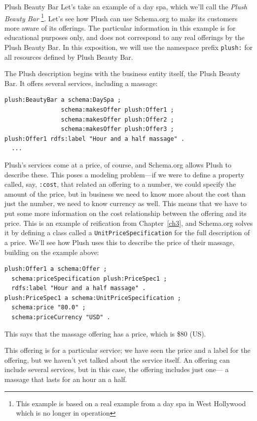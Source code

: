 \begin{example}{Plush Beauty Bar}
\label{Plushex}
Let's take an example of a day spa, which we'll call the 
\emph{Plush Beauty Bar} \footnote{This example is based on a real example from 
a day spa in West Hollywood which is no longer in operation}.   Let's see how
Plush can use Schema.org to make its customers more aware of its
offerings. 
The particular information in this example is
for educational purposes only, and does not correspond to any real
offerings by the Plush Beauty Bar. In this exposition, we will use the
namespace prefix \texttt{plush:} for all resources defined by Plush Beauty Bar.

The Plush description begins with the business entity itself, the
Plush Beauty Bar. It offers several services,
including a massage:

\begin{lstlisting}
plush:BeautyBar a schema:DaySpa ;
                schema:makesOffer plush:Offer1 ;
                schema:makesOffer plush:Offer2 ;
                schema:makesOffer plush:Offer3 ;
plush:Offer1 rdfs:label "Hour and a half massage" .
  ...
\end{lstlisting}


Plush's services come at a price, of course, and Schema.org allows Plush to
describe these.   This poses a modeling problem---if we were to
define a property called, say, \texttt{:cost}, that related an offering to a
number, we could specify the amount of the price, but in business we
need to know more about the cost than just the number, we need to know
currency as well. This means that we have to put some more information
on the cost relationship between the offering and its price. This is an
example of reification from Chapter~\ref{ch3}, and Schema.org
solves it by defining a
class called a \texttt{UnitPriceSpecification} for the full description of a
price. We'll see how Plush uses this to describe the price of their
massage, building on the example above:

\begin{lstlisting}
plush:Offer1 a schema:Offer ;
  schema:priceSpecification plush:PriceSpec1 ;
  rdfs:label "Hour and a half massage" .
plush:PriceSpec1 a schema:UnitPriceSpecification ;
  schema:price "80.0" ;
  schema:priceCurrency "USD" .
\end{lstlisting}

This says that the massage offering has a price, which is \$80 (US).

This offering is for a particular service; we have seen the price and 
a label for the offering, 
but we haven't yet talked about the service itself.  An
offering can include several services, but in this case, the offering
includes just one--- a massage that lasts for an hour an a half.  


\end{example}

